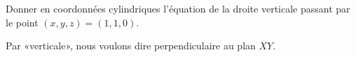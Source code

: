 
\begin{exercice}\label{exoOutilsMath-0038}

    Donner en coordonnées cylindriques l'équation de la droite verticale passant par le point $(x,y,z)=(1,1,0)$. 
    
    Par «verticale», nous voulons dire perpendiculaire au plan $XY$.

\end{exercice}

